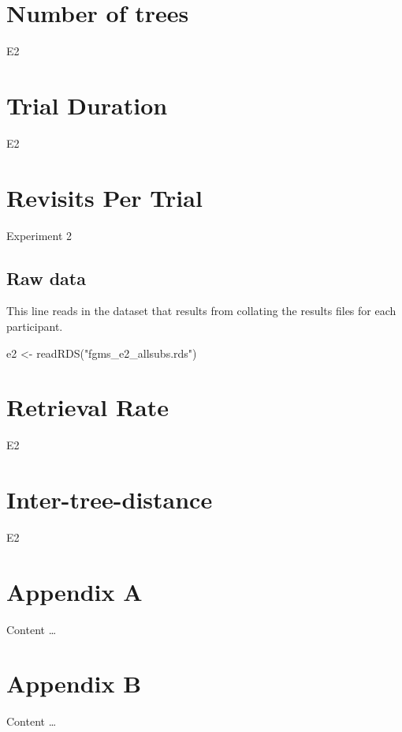 \documentclass[
]{book}
\newenvironment{Shaded}{\begin{snugshade}}{\end{snugshade}}
\newcommand{\FunctionTok}[1]{\textcolor[rgb]{0.00,0.00,0.00}{#1}}
\newcommand{\NormalTok}[1]{#1}
\newcommand{\OtherTok}[1]{\textcolor[rgb]{0.56,0.35,0.01}{#1}}
\newcommand{\StringTok}[1]{\textcolor[rgb]{0.31,0.60,0.02}{#1}}
\begin{document}
\hypertarget{number-of-trees-1}{%
\chapter{Number of trees}\label{number-of-trees-1}}

E2

\hypertarget{trial-duration-1}{%
\chapter{Trial Duration}\label{trial-duration-1}}

E2

\hypertarget{revisits-per-trial-1}{%
\chapter{Revisits Per Trial}\label{revisits-per-trial-1}}

Experiment 2

\hypertarget{raw-data-1}{%
\section{Raw data}\label{raw-data-1}}

This line reads in the dataset that results from collating the results files for each participant.

\begin{Shaded}
\begin{Highlighting}[]
\NormalTok{e2 }\OtherTok{\textless{}{-}} \FunctionTok{readRDS}\NormalTok{(}\StringTok{"fgms\_e2\_allsubs.rds"}\NormalTok{)}
\end{Highlighting}
\end{Shaded}

\hypertarget{retrieval-rate-1}{%
\chapter{Retrieval Rate}\label{retrieval-rate-1}}

E2

\hypertarget{inter-tree-distance-1}{%
\chapter{Inter-tree-distance}\label{inter-tree-distance-1}}

E2

\hypertarget{appendix-appendices}{%
\appendix}


\hypertarget{appendix-a}{%
\chapter{Appendix A}\label{appendix-a}}

Content \ldots{}

\hypertarget{appendix-b}{%
\chapter{Appendix B}\label{appendix-b}}

Content \ldots{}

  
\end{document}
